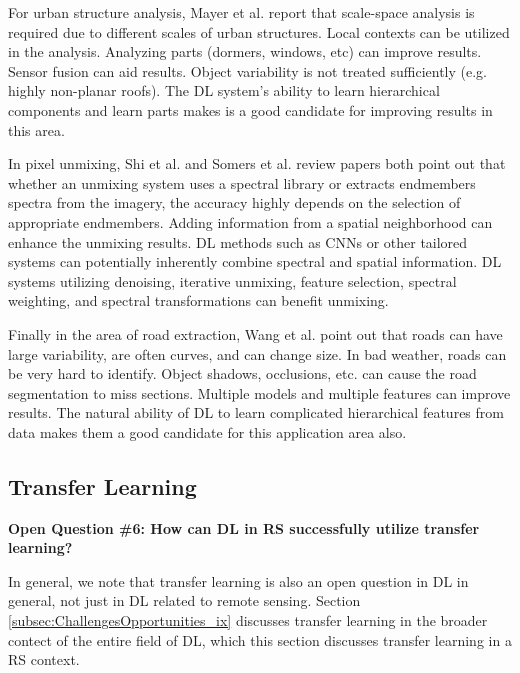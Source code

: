 \documentclass[12pt]{spieman}
\begin{document}
\begin{spacing}{1}
For urban structure analysis, Mayer et al. \cite{mayer1999automatic} report that scale-space analysis is required due to different scales of urban structures. Local contexts can be utilized in the analysis. Analyzing parts (dormers, windows, etc) can improve results. Sensor fusion can aid results. Object variability is not treated sufficiently (e.g. highly non-planar roofs). The DL system's ability to learn hierarchical components and learn parts makes is a good candidate for improving results in this area.

In pixel unmixing, Shi et al. \cite{shi2014incorporating} and Somers et al. \cite{somers2011endmember} review papers both point out that whether an unmixing system uses a spectral library or extracts endmembers spectra from the imagery, the accuracy highly depends on the selection of appropriate endmembers. Adding information from a spatial neighborhood can enhance the unmixing results. DL methods such as CNNs or other tailored systems can potentially inherently combine spectral and spatial information. DL systems utilizing denoising, iterative unmixing, feature selection, spectral weighting, and spectral transformations can benefit unmixing.

Finally in the area of road extraction, Wang et al. \cite{wang2016review} point out that roads can have large variability, are often curves, and can change size. In bad weather, roads can be very hard to identify. Object shadows, occlusions, etc. can cause the road segmentation to miss sections. Multiple models and multiple features can improve results. The natural ability of DL to learn complicated hierarchical features from data makes them a good candidate for this application area also.


%
%
\subsection{Transfer Learning} \label{subsec:ChallengesOpportunities_vi} \textbf{Open Question \#6: How can DL in RS successfully utilize transfer learning?}

In general, we note that transfer learning is also an open question in DL in general, not just in DL related to remote sensing. Section \ref{subsec:ChallengesOpportunities_ix} discusses transfer learning in the broader contect of the entire field of DL, which this section discusses transfer learning in a RS context.


\end{spacing}
\end{document}
